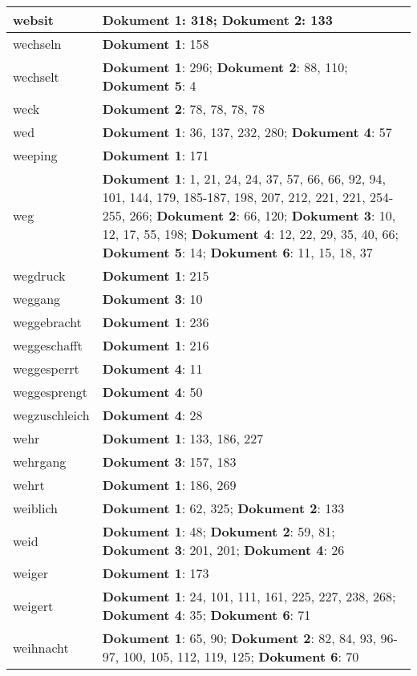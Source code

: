 \documentclass[a5paper]{article}
\begin{document}
\begin{longtable}[l]{|l|p{3in}|}
\hline
websit & \textbf{Dokument 1}: 318; \textbf{Dokument 2}: 133 \\
\hline
wechseln & \textbf{Dokument 1}: 158 \\
\hline
wechselt & \textbf{Dokument 1}: 296; \textbf{Dokument 2}: 88, 110; \textbf{Dokument 5}: 4 \\
\hline
weck & \textbf{Dokument 2}: 78, 78, 78, 78 \\
\hline
wed & \textbf{Dokument 1}: 36, 137, 232, 280; \textbf{Dokument 4}: 57 \\
\hline
weeping & \textbf{Dokument 1}: 171 \\
\hline
weg & \textbf{Dokument 1}: 1, 21, 24, 24, 37, 57, 66, 66, 92, 94, 101, 144, 179, 185-187, 198, 207, 212, 221, 221, 254-255, 266; \textbf{Dokument 2}: 66, 120; \textbf{Dokument 3}: 10, 12, 17, 55, 198; \textbf{Dokument 4}: 12, 22, 29, 35, 40, 66; \textbf{Dokument 5}: 14; \textbf{Dokument 6}: 11, 15, 18, 37 \\
\hline
wegdruck & \textbf{Dokument 1}: 215 \\
\hline
weggang & \textbf{Dokument 3}: 10 \\
\hline
weggebracht & \textbf{Dokument 1}: 236 \\
\hline
weggeschafft & \textbf{Dokument 1}: 216 \\
\hline
weggesperrt & \textbf{Dokument 4}: 11 \\
\hline
weggesprengt & \textbf{Dokument 4}: 50 \\
\hline
wegzuschleich & \textbf{Dokument 4}: 28 \\
\hline
wehr & \textbf{Dokument 1}: 133, 186, 227 \\
\hline
wehrgang & \textbf{Dokument 3}: 157, 183 \\
\hline
wehrt & \textbf{Dokument 1}: 186, 269 \\
\hline
weiblich & \textbf{Dokument 1}: 62, 325; \textbf{Dokument 2}: 133 \\
\hline
weid & \textbf{Dokument 1}: 48; \textbf{Dokument 2}: 59, 81; \textbf{Dokument 3}: 201, 201; \textbf{Dokument 4}: 26 \\
\hline
weiger & \textbf{Dokument 1}: 173 \\
\hline
weigert & \textbf{Dokument 1}: 24, 101, 111, 161, 225, 227, 238, 268; \textbf{Dokument 4}: 35; \textbf{Dokument 6}: 71 \\
\hline
weihnacht & \textbf{Dokument 1}: 65, 90; \textbf{Dokument 2}: 82, 84, 93, 96-97, 100, 105, 112, 119, 125; \textbf{Dokument 6}: 70 \\
\hline

\end{longtable}
\end{document}
